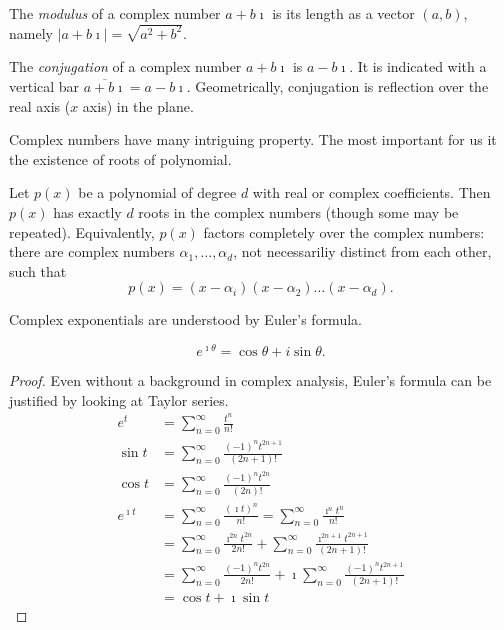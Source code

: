 \documentclass[fleqn,letterpaper]{report}
\begin{document}
\begin{defn}
The \emph{modulus} of a complex number $a + b\imath$ is its
length as a vector $(a,b)$, namely 
$|a+b\imath| = \sqrt{a^2 + b^2}$.
\end{defn}

\begin{defn}
The \emph{conjugation} of a complex number $a+b\imath$ is
$a-b\imath$. It is indicated with a vertical bar
$\overline{a+b\imath} = a-b\imath$. Geometrically,
conjugation is reflection over the real axis ($x$ axis) in the
plane. 
\end{defn}

Complex numbers have many intriguing property. The most
important for us it the existence of roots of polynomial.

\begin{thm}
Let $p(x)$ be a polynomial of degree $d$ with real or complex
coefficients. Then $p(x)$ has exactly $d$ roots in the complex
numbers (though some may be repeated). Equivalently, $p(x)$
factors completely over the complex numbers: there are complex
numbers $\alpha_1, \ldots, \alpha_d$, not necessariliy
distinct from each other, such that
\begin{equation*}
p(x) = (x-\alpha_i)(x-\alpha_2)\ldots(x-\alpha_d).
\end{equation*}
\end{thm}

Complex exponentials are understood by Euler's formula.

\begin{prop}
\label{prop-eulers-formula}
\begin{equation*}
e^{\imath \theta} = \cos \theta + i \sin \theta.
\end{equation*}
\end{prop}

\begin{proof}
Even without a background in complex analysis, Euler's formula
can be justified by looking at Taylor series.
\begin{align*}
e^t & = \sum_{n=0}^\infty \frac{t^n}{n!} \\
\sin t & = \sum_{n=0}^\infty \frac{(-1)^n t^{2n+1}}{(2n+1)!} \\
\cos t & = \sum_{n=0}^\infty \frac{(-1)^n t^{2n}}{(2n)!} \\
e^{\imath t} 
& = \sum_{n=0}^\infty \frac{(\imath t)^n}{n!} 
= \sum_{n=0}^\infty \frac{\imath^n t^n}{n!} \\
& = \sum_{n=0}^\infty \frac{\imath^{2n} t^{2n}}{{2n}!} 
+ \sum_{n=0}^\infty \frac{\imath^{2n+1} t^{2n+1}}{(2n+1)!} \\
& = \sum_{n=0}^\infty \frac{(-1)^n t^{2n}}{{2n}!} 
+ \imath \sum_{n=0}^\infty \frac{(-1)^n t^{2n+1}}{(2n+1)!} \\
& = \cos t + \imath \sin t
\end{align*}
\end{proof}
\end{document}
